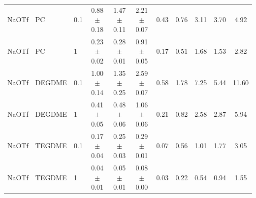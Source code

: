 \begin{table}[h]
{\begin{tabular}{lll ccc cc ccc}
NaOTf & PC & 0.1 & 0.88 $\pm$ 0.18 & 1.47 $\pm$ 0.11 & 2.21 $\pm$ 0.07 & 0.43 & 0.76 & 3.11 & 3.70 & 4.92 \\
NaOTf & PC & 1 & 0.23 $\pm$ 0.02 & 0.28 $\pm$ 0.01 & 0.91 $\pm$ 0.05 & 0.17 & 0.51 & 1.68 & 1.53 & 2.82 \\
NaOTf & DEGDME & 0.1 & 1.00 $\pm$ 0.14 & 1.35 $\pm$ 0.25 & 2.59 $\pm$ 0.07 & 0.58 & 1.78 & 7.25 & 5.44 & 11.60 \\
NaOTf & DEGDME & 1 & 0.41 $\pm$ 0.05 & 0.48 $\pm$ 0.06 & 1.06 $\pm$ 0.06 & 0.21 & 0.82 & 2.58 & 2.87 & 5.94 \\
NaOTf & TEGDME & 0.1 & 0.17 $\pm$ 0.04 & 0.25 $\pm$ 0.03 & 0.29 $\pm$ 0.01 & 0.07 & 0.56 & 1.01 & 1.77 & 3.05 \\
NaOTf & TEGDME & 1 & 0.04 $\pm$ 0.01 & 0.05 $\pm$ 0.01 & 0.08 $\pm$ 0.00 & 0.03 & 0.22 & 0.54 & 0.94 & 1.55 \\
\bottomrule
\end{tabular}%
}
\end{table}
